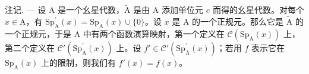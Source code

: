 注记. --- 设 A 是一个幺星代数，\(\widetilde{\mathrm{A}}\) 是由 A 添加单位元 \(e\) 而得的幺星代数。对每个 \(x \in \mathrm{A}\)，有 \(\mathrm{Sp}_{\mathrm{A}}^{\prime}(x) = \mathrm{Sp}_{\mathrm{A}}(x) \cup \{0\}\)。设 \(x\) 是 A 的一个正规元。那么它是 \(\widetilde{\mathrm{A}}\) 的一个正规元，于是 A 中有两个函数演算映射，第一个定义在 \(\mathcal{C}(\mathrm{Sp}_{\mathrm{A}}(x))\) 上，第二个定义在 \(\mathcal{C}'(\mathrm{Sp}_{\mathrm{A}}^{\prime}(x))\) 上。设 \(f' \in \mathcal{C}'(\mathrm{Sp}_{\mathrm{A}}^{\prime}(x))\)；若用 \(f\) 表示它在 \(\mathrm{Sp}_{\mathrm{A}}(x)\) 上的限制，则我们有 \(f'(x) = f(x)\)。

